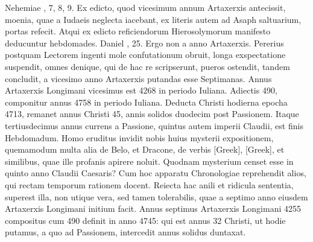 Nehemiae , 7, 8, 9.
Ex edicto, quod vicesimum
annum Artaxerxis antecissit, moenia, quae a Iudaeis neglecta
iacebant, ex literis autem ad Asaph saltuarium, portas refecit.
Atqui ex edicto reficiendorum Hierosolymorum manifesto deducuntur
hebdomades.
Daniel , 25.
Ergo non a  anno Artaxerxis.
Pererius postquam Lectorem ingenti mole confutationum
obruit, longa exspectatione suspendit, omnes denique, qui
de hac re scripserunt, pueros ostendit, tandem concludit, a vicesimo
anno Artaxerxis putandas esse Septimanas.
Annus Artaxerxis
Longimani vicesimus est 4268 in periodo Iuliana.
Adiectis 490,
componitur annus 4758 in periodo Iuliana.
Deducta Christi hodierna
epocha 4713, remanet annus Christi 45, annis solidos duodecim
post Passionem.
Itaque tertiusdecimus annus currens a Passione,
quintus autem imperii Claudii, est finis Hebdomadum.
Homo eruditus invidit nobis huius mysterii expositionem, quemamodum
multa alia de Belo, et Dracone, de verbis \textgreek{[Greek]},
\textgreek{[Greek]}, et similibus, quae ille profanis apirere noluit.
Quodnam mysterium censet esse in quinto anno Claudii Caesaris?
Cum hoc apparatu Chronologiae reprehendit alios, qui rectam
temporum rationem docent.
Reiecta hac anili et ridicula sententia,
superest illa, non utique vera, sed tamen tolerabilis, quae a
septimo anno eiusdem Artaxerxis Longimani initium facit.
Annus septimus Artaxerxis Longimani 4255 compositus cum 490
definit in anno 4745: qui est annus 32 Christi, ut hodie putamus,
a quo ad Passionem, intercedit annus solidus duntaxat.
